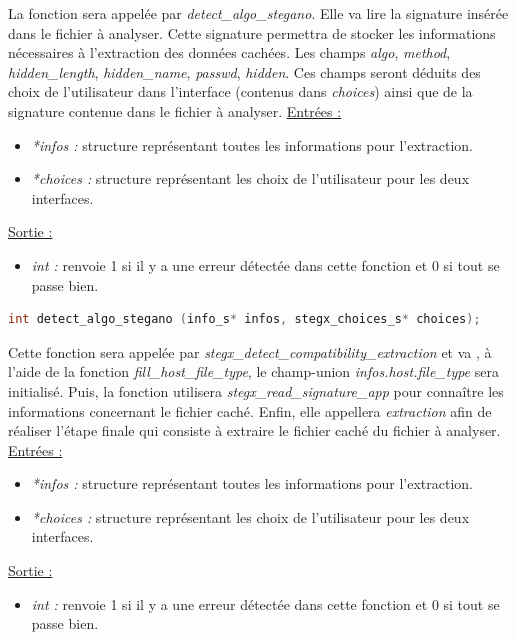 \documentclass[11pt]{article}
\begin{document}
La fonction sera appelée par \textit{detect\_algo\_stegano}.
Elle va lire la signature insérée dans le fichier à analyser. 
Cette signature permettra de stocker les informations nécessaires à 
l'extraction des données cachées. 
Les champs \textit{algo}, \textit{method}, \textit{hidden\_length}, 
\textit{hidden\_name}, \textit{passwd}, \textit{hidden}. Ces champs seront 
déduits des choix de l'utilisateur dans l'interface (contenus dans 
\textit{choices}) ainsi que de la signature contenue dans le fichier à 
analyser. 
\newline
\underline{Entrées :} 
\begin{itemize}
\item \textit{*infos :} structure représentant toutes les informations pour 
l'extraction.  
\item \textit{*choices :} structure représentant les choix de 
l'utilisateur pour les deux interfaces. 
\end{itemize}
\underline{Sortie :} 
\begin{itemize}
\item \textit{int :} renvoie 1 si il y a une erreur détectée dans cette 
fonction et 0 si tout se passe bien.  
\newline 
\end{itemize}

\begin{lstlisting}[language=c]
int detect_algo_stegano (info_s* infos, stegx_choices_s* choices); 
\end{lstlisting}

Cette fonction sera appelée par \textit{stegx\_detect\_compatibility\_extraction}
et va , à l'aide de la fonction \textit{fill\_host\_file\_type}, 
le champ-union \textit{infos.host.file\_type} sera initialisé. Puis, la 
fonction utilisera \newline \textit{stegx\_read\_signature\_app} pour connaître les 
informations concernant le fichier caché. 
Enfin, elle appellera \textit{extraction} afin de réaliser l'étape finale 
qui consiste à extraire le fichier caché du fichier à analyser. 
\newline
\underline{Entrées :} 
\begin{itemize}
\item \textit{*infos :} structure représentant toutes les informations pour 
l'extraction.  
\item \textit{*choices :} structure représentant les choix de 
l'utilisateur pour les deux interfaces. 
\end{itemize}
\underline{Sortie :} 
\begin{itemize}
\item \textit{int :} renvoie 1 si il y a une erreur détectée dans cette 
fonction et 0 si tout se passe bien.  
\newline 
\end{itemize}
\end{document}
